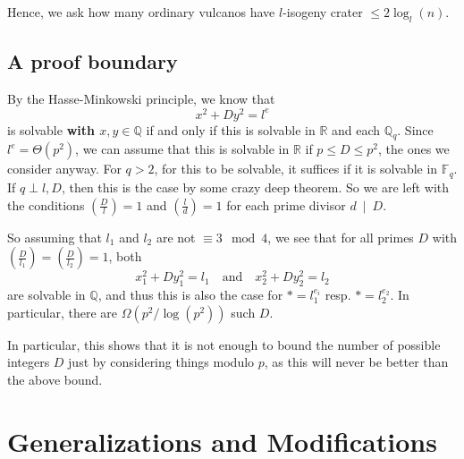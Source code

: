 \documentclass{scrartcl}
\newcommand{\F}{\mathbb{F}}
\newcommand{\divides}{\ \mid \ }
\theoremstyle{definition}
\begin{document}
Hence, we ask how many ordinary vulcanos have $l$-isogeny crater $\leq 2\log_l(n)$.

\subsection*{A proof boundary}
By the Hasse-Minkowski principle, we know that
\begin{equation*}
    x^2 + D y^2 = l^e
\end{equation*}
is solvable \textbf{with $x, y \in \mathbb{Q}$} if and only if this is solvable in $\mathbb{R}$ and each $\mathbb{Q}_q$.
Since $l^e = \Theta(p^2)$, we can assume that this is solvable in $\mathbb{R}$ if $p \leq D \leq p^2$, the ones we consider anyway.
For $q > 2$, for this to be solvable, it suffices if it is solvable in $\F_q$.
If $q \perp l, D$, then this is the case by some crazy deep theorem.
So we are left with the conditions $(\frac D l) = 1$ and $(\frac l d) = 1$ for each prime divisor $d \divides D$.

So assuming that $l_1$ and $l_2$ are not $\equiv 3 \mod 4$, we see that for all primes $D$ with $(\frac D {l_1}) = (\frac D {l_2}) = 1$, both
\begin{equation*}
    x_1^2 + Dy_1^2 = l_1 \quad \text{and} \quad x_2^2 + Dy_2^2 = l_2
\end{equation*}
are solvable in $\mathbb{Q}$, and thus this is also the case for $* = l_1^{e_i}$ resp. $* = l_2^{e_2}$.
In particular, there are $\Omega(p^2/\log(p^2))$ such $D$.

In particular, this shows that it is not enough to bound the number of possible integers $D$ just by considering things modulo $p$, as this will never be better than the above bound.

\section{Generalizations and Modifications}
\end{document}
